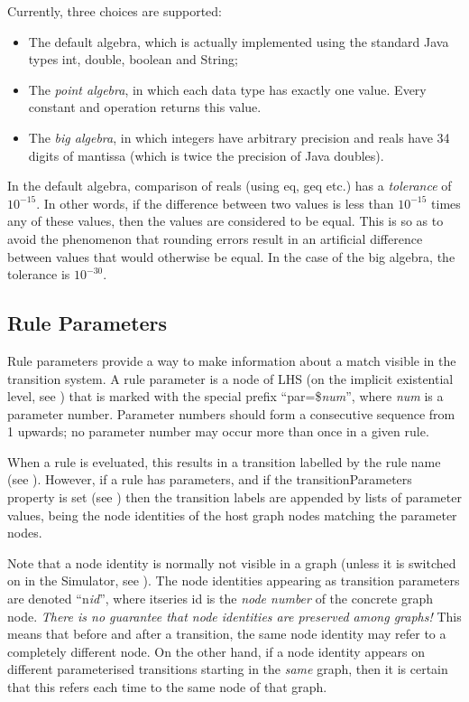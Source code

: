 Currently, three choices are supported:
\begin{itemize}\noitemsep
\item The default algebra, which is actually
implemented using the standard Java types \textsf{int}, \textsf{double},
\textsf{boolean} and \textsf{String};
\item The \emph{point algebra}, in which each data type has exactly one
  value. Every constant and operation returns this value.
\item The \emph{big algebra}, in which integers have arbitrary precision and
  reals have 34 digits of mantissa (which is twice the precision of Java
  \textsf{double}s).
\end{itemize}
%
In the default algebra, comparison of reals (using \textsf{eq}, \textsf{geq}
etc.) has a \emph{tolerance} of $10^{-15}$. In other words, if the difference
between two values is less than $10^{-15}$ times any of these values, then the
values are considered to be equal. This is so as to avoid the phenomenon that
rounding errors result in an artificial difference between values that would
otherwise be equal. In the case of the big algebra, the tolerance is
$10^{-30}$.

\subsection{Rule Parameters}

Rule parameters provide a way to make information about a match visible in the
transition system. A rule parameter is a node of LHS (on the implicit
existential level, see ) that is marked with the special prefix
``\textsf{par=\${\itshape num}}'', where \textsf{\itshape num} is a parameter
number. Parameter numbers should form a consecutive sequence from 1 upwards; no
parameter number may occur more than once in a given rule.

When a rule is eveluated, this results in a transition labelled by the rule
name (see ). However, if a rule has parameters, and if the
\textsf{transitionParameters} property is set (see )
then the transition labels are appended by lists of parameter values, being the
node identities of the host graph nodes matching the parameter nodes.

Note that a node identity is normally not visible in a graph (unless it is
switched on in the Simulator, see ). The node identities
appearing as transition parameters are denoted ``\textsf{n{\itshape id}}'',
where \textsf{itseries id} is the \emph{node number} of the concrete graph
node. \emph{There is no guarantee that node identities are preserved among
graphs!} This means that before and after a transition, the same node identity
may refer to a completely different node. On the other hand, if a node identity
appears on different
parameterised transitions starting in the \emph{same} graph, then it is certain
that this refers each time to the same node of that graph.

